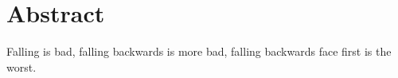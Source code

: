 \documentclass[../thesis.tex]{subfiles}
\begin{document}
\chapter*{Abstract}

Falling is bad, falling backwards is more bad, falling backwards face first is the worst.
\end{document}
